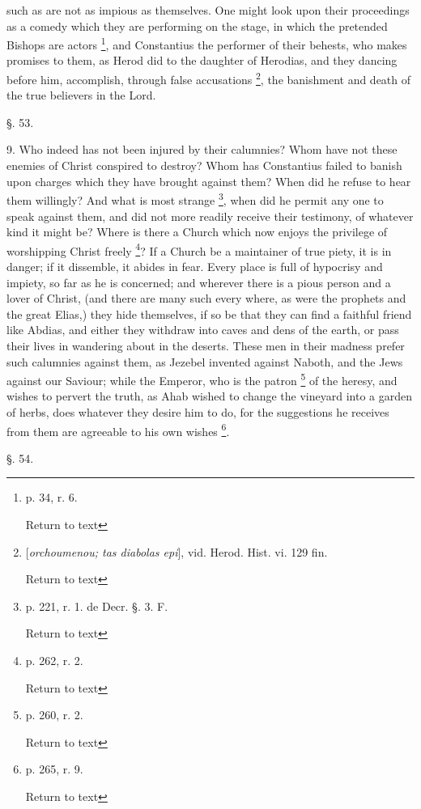 such as are not as impious as themselves. One might look upon their
proceedings as a comedy which they are performing on the stage, in
which the pretended Bishops are actors \footnote{p. 34, r. 6.

Return to text}, and Constantius the
performer of their behests, who makes promises to them, as Herod did
to the daughter of Herodias, and they dancing before him, accomplish,
through false accusations \footnote{[\emph{orchoumenou; tas diabolas epi}], vid.
Herod. Hist. vi. 129 fin.

Return to text}, the banishment and death of the
true believers in the Lord.

§. 53.

9. Who indeed has not been injured by their
calumnies? Whom have not these enemies of Christ conspired to destroy?
Whom has Constantius failed to banish upon charges which they
have brought against them? When did he refuse to hear them willingly?
And what is most strange \footnote{p. 221, r. 1. de Decr. §. 3. F.

Return to text}, when did he permit any one to
speak against them, and did not more readily receive their testimony,
of whatever kind it might be? Where is there a Church which now enjoys
the privilege of worshipping Christ freely \footnote{p. 262, r. 2.

Return to text}? If a Church be a
maintainer of true piety, it is in danger; if it dissemble, it abides
in fear. Every place is full of hypocrisy and impiety, so far as he is
concerned; and wherever there is a pious person and a lover of Christ,
(and there are many such every where, as were the prophets and the
great Elias,) they hide themselves, if so be that they can find a
faithful friend like Abdias, and either they withdraw into caves and
dens of the earth, or pass their lives in wandering about in the
deserts. These men in their madness prefer such calumnies against
them, as Jezebel invented against Naboth, and the Jews against our
Saviour; while the Emperor, who is the patron \footnote{p. 260, r. 2.

Return to text} of the heresy,
and wishes to pervert the truth, as Ahab wished to change the vineyard
into a garden of herbs, does whatever they desire him to do, for the
suggestions he receives from them are agreeable to his own wishes \footnote{p. 265, r. 9.

Return to text}.

§. 54.

